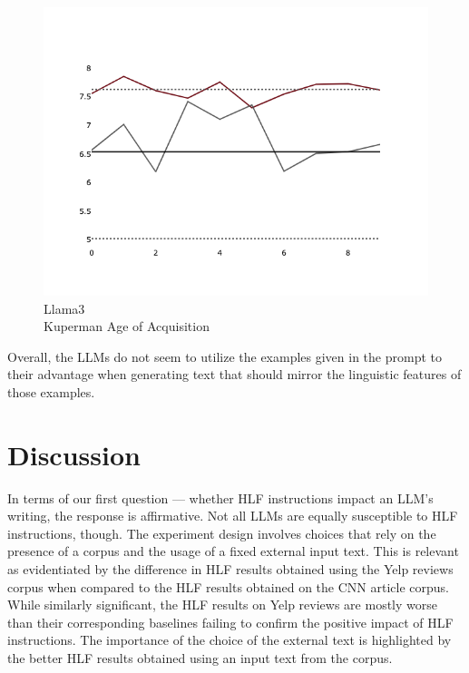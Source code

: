 \documentclass[11pt]{article}
\begin{document}
\begin{figure}[ht!]
\begin{minipage}{0.32\textwidth}
    \end{minipage}
    \hfill
    \begin{minipage}{0.32\textwidth}
        \includegraphics[width=\linewidth]{plots/prompt_2_ifd/prompt_2-llama3_70b-cnn_dailymail/prompt_2-llama3_70b-cnn_dailymail_a_kup_pw.png}
        \caption[center]{Llama3\\Kuperman Age of Acquisition}\label{fig-p2-ifd-llama3-a-kup-pw}
    \end{minipage}
\end{figure}

Overall, the LLMs do not seem to utilize the examples given in the prompt to
their advantage when generating text that should mirror the linguistic features
of those examples.

\section{Discussion}

In terms of our first question --- whether HLF instructions impact an LLM's
writing, the response is affirmative.
Not all LLMs are equally susceptible to HLF instructions, though.
The experiment design involves choices that rely on the presence of a corpus and
the usage of a fixed external input text.
This is relevant as evidentiated by the difference in HLF results obtained using
the Yelp reviews corpus when compared to the HLF results obtained on the CNN
article corpus.
While similarly significant, the HLF results on Yelp reviews are mostly worse
than their corresponding baselines failing to confirm the positive impact of HLF
instructions.
The importance of the choice of the external text is highlighted by the better
HLF results obtained using an input text from the corpus.
\end{document}
